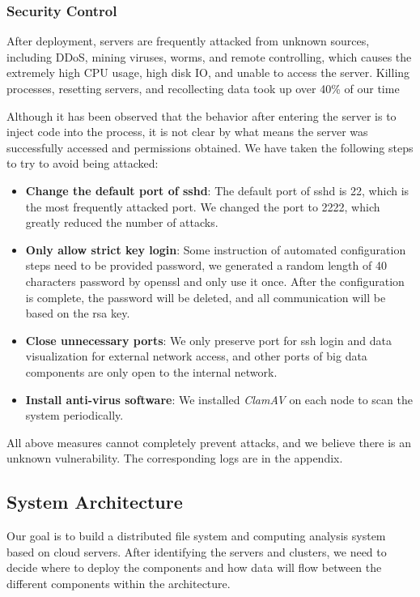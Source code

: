 \subsubsection{Security Control}    
After deployment, servers are frequently attacked from unknown sources, including DDoS, mining viruses, worms, and remote controlling, which causes the extremely high CPU usage, high disk IO, and unable to access the server. Killing processes, resetting servers, and recollecting data took up over 40\% of our time


Although it has been observed that the behavior after entering the server is to inject code into the process, it is not clear by what means the server was successfully accessed and permissions obtained. We have taken the following steps to try to avoid being attacked:

\begin{itemize}
    \item \textbf{Change the default port of sshd}: The default port of sshd is 22, which is the most frequently attacked port. We changed the port to 2222, which greatly reduced the number of attacks.
    \item \textbf{Only allow strict key login}: Some instruction of automated configuration steps need to be provided password, we generated a random length of 40 characters password by openssl and only use it once. After the configuration is complete, the password will be deleted, and all communication will be based on the rsa key.
    \item \textbf{Close unnecessary ports}: We only preserve port for ssh login and data visualization for external network access, and other ports of big data components are only open to the internal network.
    \item \textbf{Install anti-virus software}: We installed \textit{ClamAV} on each node to scan the system periodically.
\end{itemize}

All above measures cannot completely prevent attacks, and we believe there is an unknown vulnerability. The corresponding logs are in the appendix.




\subsection{System Architecture}
Our goal is to build a distributed file system and computing analysis system based on cloud servers. After identifying the servers and clusters, we need to decide where to deploy the components and how data will flow between the different components within the architecture.



